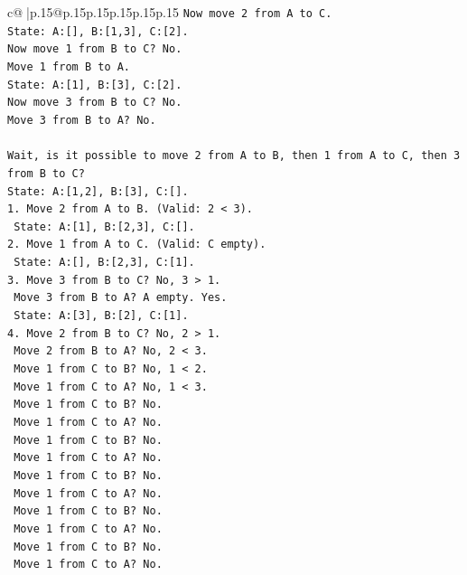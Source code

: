 \documentclass{article}
\begin{document}
{\begin{supertabular}{c@{$\;$}|p{.15\linewidth}@{}p{.15\linewidth}p{.15\linewidth}p{.15\linewidth}p{.15\linewidth}p{.15\linewidth}}
{{{\texttt{Now move 2 from A to C.} \\
\texttt{State: A:{[}{]}, B:{[}1,3{]}, C:{[}2{]}.} \\
\texttt{Now move 1 from B to C? No.} \\
\texttt{Move 1 from B to A.} \\
\texttt{State: A:{[}1{]}, B:{[}3{]}, C:{[}2{]}.} \\
\texttt{Now move 3 from B to C? No.} \\
\texttt{Move 3 from B to A? No.} \\
\\ 
\texttt{Wait, is it possible to move 2 from A to B, then 1 from A to C, then 3 from B to C?} \\
\texttt{State: A:{[}1,2{]}, B:{[}3{]}, C:{[}{]}.} \\
\texttt{1. Move 2 from A to B. (Valid: 2 < 3).} \\
\texttt{   State: A:{[}1{]}, B:{[}2,3{]}, C:{[}{]}.} \\
\texttt{2. Move 1 from A to C. (Valid: C empty).} \\
\texttt{   State: A:{[}{]}, B:{[}2,3{]}, C:{[}1{]}.} \\
\texttt{3. Move 3 from B to C? No, 3 > 1.} \\
\texttt{   Move 3 from B to A? A empty. Yes.} \\
\texttt{   State: A:{[}3{]}, B:{[}2{]}, C:{[}1{]}.} \\
\texttt{4. Move 2 from B to C? No, 2 > 1.} \\
\texttt{   Move 2 from B to A? No, 2 < 3.} \\
\texttt{   Move 1 from C to B? No, 1 < 2.} \\
\texttt{   Move 1 from C to A? No, 1 < 3.} \\
\texttt{   Move 1 from C to B? No.} \\
\texttt{   Move 1 from C to A? No.} \\
\texttt{   Move 1 from C to B? No.} \\
\texttt{   Move 1 from C to A? No.} \\
\texttt{   Move 1 from C to B? No.} \\
\texttt{   Move 1 from C to A? No.} \\
\texttt{   Move 1 from C to B? No.} \\
\texttt{   Move 1 from C to A? No.} \\
\texttt{   Move 1 from C to B? No.} \\
\texttt{   Move 1 from C to A? No.} \\
}}}
\end{supertabular}}
\end{document}
